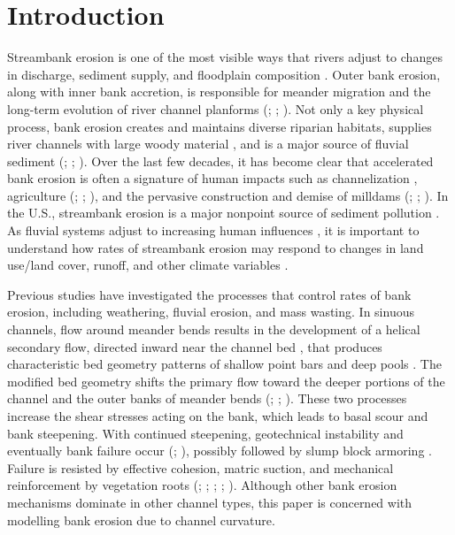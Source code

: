 \documentclass[preprint, review, authoryear, 12pt]{elsarticle}
\begin{document}
\linenumbers

\section{Introduction}

Streambank erosion is one of the most visible ways that rivers adjust to changes in discharge, sediment supply, and floodplain composition \citep{Leopold1960}. Outer bank erosion, along with inner bank accretion, is responsible for meander migration and the long-term evolution of river channel planforms (\citealp{Crosato2009}; \citealp{Parker2011}; \citealp{Eke2014}). Not only a key physical process, bank erosion creates and maintains diverse riparian habitats, supplies river channels with large woody material \citep{Florsheim2008}, and is a major source of fluvial sediment (\citealp{Bull1997}; \citealp{Sekely2002}; \citealp{Kronvang2013}). Over the last few decades, it has become clear that accelerated bank erosion is often a signature of human impacts such as channelization \citep{Hupp1991}, agriculture (\citealp{Knox2006}; \citealp{Walter2008}; \citealp{Kemp2016}), and the pervasive construction and demise of milldams (\citealp{Pizzuto2009a}; \citealp{Merritts2011}; \citealp{Lyons2015}). In the U.S., streambank erosion is a major nonpoint source of sediment pollution \citep{USEPA2000}. As fluvial systems adjust to increasing human influences \citep{Gregory2006}, it is important to understand how rates of streambank erosion may respond to changes in land use/land cover, runoff, and other climate variables \citep{Pelletier2015}.

Previous studies have investigated the processes that control rates of bank erosion, including weathering, fluvial erosion, and mass wasting. In sinuous channels, flow around meander bends results in the development of a helical secondary flow, directed inward near the channel bed \citep{Leopold1960}, that produces characteristic bed geometry patterns of shallow point bars and deep pools \citep{Hooke1975}. The modified bed geometry shifts the primary flow toward the deeper portions of the channel and the outer banks of meander bends (\citealp{Hooke1975}; \citealp{Dietrich1979}; \citealp{Dietrich1983}). These two processes increase the shear stresses acting on the bank, which leads to basal scour and bank steepening. With continued steepening, geotechnical instability and eventually bank failure occur (\citealp{Thorne1982}; \citealp{Lawler1997}), possibly followed by slump block armoring \citep{Parker2011}. Failure is resisted by effective cohesion, matric suction, and mechanical reinforcement by vegetation roots (\citealp{Osman1988a}; \citealp{Simon2000}; \citealp{Pollen2005}; \citealp{Pollen2007}; \citealp{Thomas2010}). Although other bank erosion mechanisms dominate in other channel types, this paper is concerned with modelling bank erosion due to channel curvature. 
\end{document}
